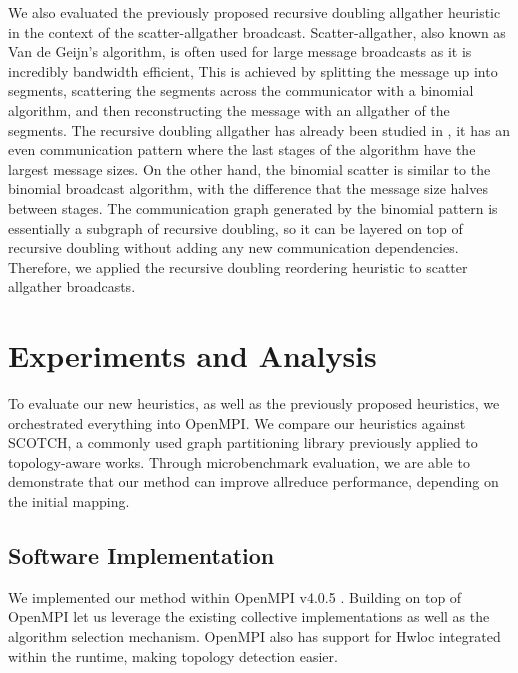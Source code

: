 We also evaluated the previously proposed recursive doubling allgather heuristic in the context of the scatter-allgather broadcast.
Scatter-allgather, also known as Van de Geijn's algorithm, is often used for large message broadcasts as it is incredibly bandwidth efficient, 
This is achieved by splitting the message up into segments, scattering the segments across the communicator with a binomial algorithm, and then reconstructing the message with an allgather of the segments.
The recursive doubling allgather has already been studied in \cite{Mirsadeghi2016TopoAwareCollRR}, it has an even communication pattern where the last stages of the algorithm have the largest message sizes.
On the other hand, the binomial scatter is similar to the binomial broadcast algorithm, with the difference that the message size halves between stages. 
The communication graph generated by the binomial pattern is essentially a subgraph of recursive doubling, so it can be layered on top of recursive doubling without adding any new communication dependencies. 
Therefore, we applied the recursive doubling reordering heuristic to scatter allgather broadcasts.

\section{Experiments and Analysis}
To evaluate our new heuristics, as well as the previously proposed heuristics, we orchestrated everything into OpenMPI.
We compare our heuristics against SCOTCH, a commonly used graph partitioning library previously applied to topology-aware works.
Through microbenchmark evaluation, we are able to demonstrate that our method can improve allreduce performance, depending on the initial mapping.

\subsection{Software Implementation}
We implemented our method within OpenMPI v4.0.5 \cite{gabriel2004OpenMPI}.
Building on top of OpenMPI let us leverage the existing collective implementations as well as the algorithm selection mechanism.
OpenMPI also has support for Hwloc integrated within the runtime, making topology detection easier.

